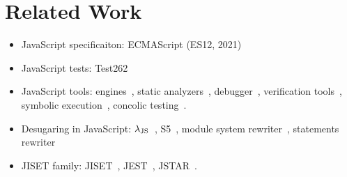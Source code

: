 \section{Related Work}\label{sec:related}

\begin{itemize}
  \item JavaScript specificaiton: ECMAScript (ES12, 2021)~\cite{es12}
  \item JavaScript tests: Test262~\cite{test262}
  \item JavaScript tools: engines~\cite{v8, jscore, chakra, spidermonkey},
    static analyzers~\cite{safe, safe2, tajs, wala, jsai},
    debugger~\cite{jsexplain}, verification tools~\cite{javert, javert2,
    ad-safety, javanni}, symbolic execution~\cite{symbolic-js, sym-js, expo-se},
    concolic testing~\cite{jalangi, type-conc-test}.
  \item Desugaring in JavaScript: $\lambda_\text{JS}$~\cite{lambda-js}, S5~\cite{s5},
    module system rewriter~\cite{js-module},  statements
    rewriter~\cite{js-with}
  \item JISET family: JISET~\cite{jiset}, JEST~\cite{jest}, JSTAR~\cite{jstar}.
\end{itemize}

\todo
